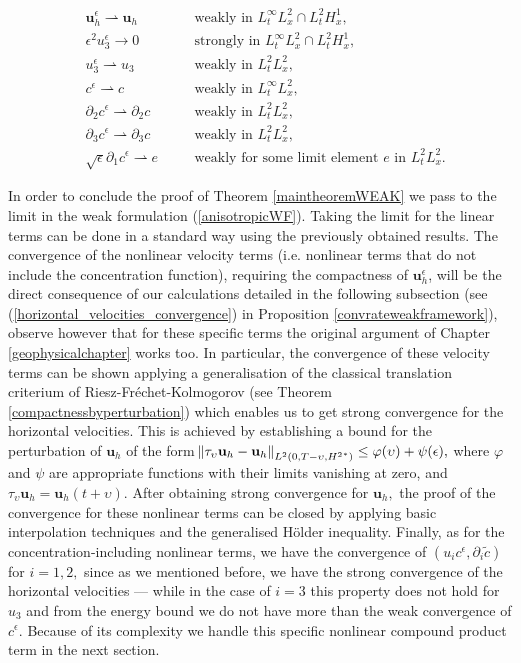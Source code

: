 \documentclass[12pt]{report}
\numberwithin{theorem}{chapter}
\numberwithin{corollary}{chapter}
\numberwithin{lemma}{chapter}
\numberwithin{remark}{chapter}
\numberwithin{definition}{chapter}
\numberwithin{prop}{chapter}
\begin{document}
    \begin{align} 
    &  \mathbf{u}_h^\epsilon \rightharpoonup \mathbf{u}_h &\quad & \text{weakly in $L_t^\infty L_x^2 \cap L_t^2 H_x^1$,} \label{WeakConvUHEps} \\
    &  \epsilon^2 u_3^\epsilon \to 0 &\quad & \text{strongly in $L_t^\infty L_x^2 \cap L_t^2 H_x^1$,} \label{WeakConvU3Eps} \\ 
    & u_3^\epsilon \rightharpoonup u_3  &\quad & \text{weakly in $L_t^2 L_x^2$,} \label{WeakConvU3NoEps} \\
    & c^\epsilon \rightharpoonup c &\quad & \text{weakly in $L_t^\infty L_x^2$,} \label{WeakConvCEps1} \\
    & \partial_2 c^\epsilon \rightharpoonup \partial_2 c &\quad & \text{weakly in $L_t^2 L_x^2$,} \label{WeakConvCEps2} \\
    & \partial_3 c^\epsilon \rightharpoonup \partial_3 c &\quad & \text{weakly in $L_t^2 L_x^2$,} \label{WeakConvCEps3} \\
    & \sqrt{\epsilon} \partial_1 c^\epsilon \rightharpoonup e &\quad & \text{weakly for some limit element $e$ in $L_t^2 L_x^2$.} \label{WeakConvCEps4}
  \end{align} 
  
  In order to conclude the proof of Theorem \ref{maintheoremWEAK} we pass to the limit in the weak formulation (\ref{anisotropicWF}). Taking the limit for the linear terms can be done in a standard way using the previously obtained results.
   The convergence of the nonlinear velocity terms (i.e. nonlinear terms that do not include the concentration function), requiring the compactness of $\mathbf{u}_h^\epsilon$, will be the direct consequence of our calculations detailed in the following subsection (see (\ref{horizontal_velocities_convergence}) in Proposition \ref{convrateweakframework}), observe however that for these specific terms the original argument of Chapter \ref{geophysicalchapter} works too. In particular, the convergence of these velocity terms can be shown applying a generalisation of the classical translation criterium of Riesz-Fr\'echet-Kolmogorov (see Theorem \ref{compactnessbyperturbation}) which enables us to get strong convergence for the horizontal velocities. This is achieved by establishing a bound for the perturbation of $\mathbf{u}_h$ of the form $\norm{\tau_\upsilon \mathbf{u}_h - \mathbf{u}_h}_{L^2(0,T-\upsilon, {H^2}^*)} \leq \varphi(\upsilon) + \psi(\epsilon),$ where $\varphi$ and $\psi$ are appropriate functions with their limits vanishing at zero, and $\tau_\upsilon \mathbf{u}_h = \mathbf{u}_h (t+\upsilon) $. After obtaining strong convergence for $\mathbf{u}_h,$ the proof of the convergence for these nonlinear terms can be closed by applying basic interpolation techniques and the generalised H\"older inequality. 
  Finally, as for the concentration-including nonlinear terms, we have the convergence of $(u_i c^\epsilon, \partial_i \tilde{c})$ for $i=1,2,$ since as we mentioned before, we have the strong convergence of the horizontal velocities --- while in the case of $i=3$ this property does not hold for $u_3$ and from the energy bound we do not have more than the weak convergence of $c^\epsilon$. Because of its complexity we handle this specific nonlinear compound product term in the next section.
  
\end{document}
